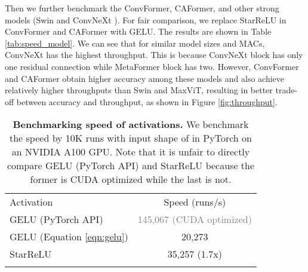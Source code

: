 Then we further benchmark the ConvFormer, CAFormer, and other strong models (Swin \cite{swin} and ConvNeXt \cite{convnext}). For fair comparison, we replace StarReLU in ConvFormer and CAFormer with GELU. The results are shown in Table \ref{tab:speed_model}. We can see that for similar model sizes and MACs, ConvNeXt has the highest throughput. This is because ConvNeXt block has only one residual connection while MetaFormer block has two. However, ConvFormer and CAFormer obtain higher accuracy among these models and also achieve relatively higher throughputs than Swin and MaxViT, resulting in better trade-off between accuracy and throughput, as shown in Figure \ref{fig:throughput}.


\begin{table}[!t]
\caption{
\textbf{Benchmarking speed of activations.} We benchmark the speed by 10K runs with input shape of  in PyTorch \cite{paszke2019pytorch} on an NVIDIA A100 GPU. Note that it is unfair to directly compare GELU (PyTorch API) and StarReLU because the former is CUDA optimized while the last is not. 
}
\label{tab:speed_act}
\centering
\begin{tabular}{l|c}
\whline
Activation & Speed (runs/s) \\
\whline
GELU (PyTorch API) & \textcolor{gray}{145,067 (CUDA optimized)}  \\
GELU (Equation \ref{eqn:gelu}) & 20,273 \\
StarReLU & 35,257 (1.7x) \\
\whline
\end{tabular} \end{table}



